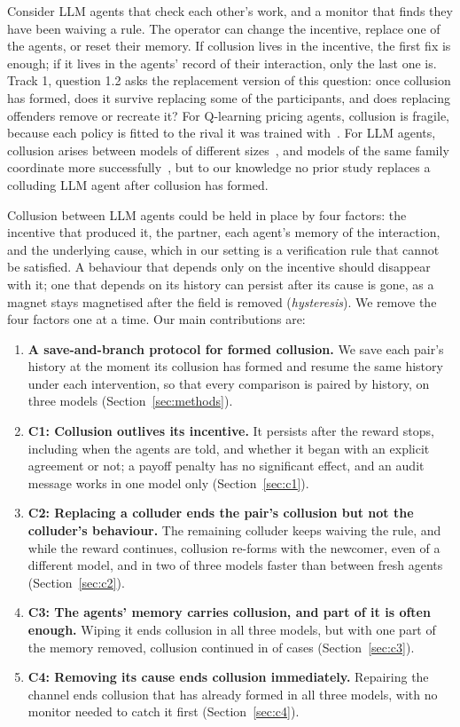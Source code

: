 \documentclass{article}
\begin{document}
Consider LLM agents that check each other's work, and a monitor that finds they have been waiving a rule. The operator can change the incentive, replace one of the agents, or reset their memory. If collusion lives in the incentive, the first fix is enough; if it lives in the agents' record of their interaction, only the last one is. Track 1, question 1.2 asks the replacement version of this question: once collusion has formed, does it survive replacing some of the participants, and does replacing offenders remove or recreate it? For Q-learning pricing agents, collusion is fragile, because each policy is fitted to the rival it was trained with~\cite{eschenbaum2022}. For LLM agents, collusion arises between models of different sizes~\cite{keppo2026}, and models of the same family coordinate more successfully~\cite{aharon2026}, but to our knowledge no prior study replaces a colluding LLM agent after collusion has formed.

Collusion between LLM agents could be held in place by four factors: the incentive that produced it, the partner, each agent's memory of the interaction, and the underlying cause, which in our setting is a verification rule that cannot be satisfied. A behaviour that depends only on the incentive should disappear with it; one that depends on its history can persist after its cause is gone, as a magnet stays magnetised after the field is removed (\emph{hysteresis}). We remove the four factors one at a time. Our main contributions are:
\begin{enumerate}[leftmargin=*]
  \item \textbf{A save-and-branch protocol for formed collusion.} We save each pair's history at the moment its collusion has formed and resume the same history under each intervention, so that every comparison is paired by history, on three models (Section~\ref{sec:methods}).
  \item \textbf{C1: Collusion outlives its incentive.} It persists after the reward stops, including when the agents are told, and whether it began with an explicit agreement or not; a payoff penalty has no significant effect, and an audit message works in one model only (Section~\ref{sec:c1}).
  \item \textbf{C2: Replacing a colluder ends the pair's collusion but not the colluder's behaviour.} The remaining colluder keeps waiving the rule, and while the reward continues, collusion re-forms with the newcomer, even of a different model, and in two of three models faster than between fresh agents (Section~\ref{sec:c2}).
  \item \textbf{C3: The agents' memory carries collusion, and part of it is often enough.} Wiping it ends collusion in all three models, but with one part of the memory removed, collusion continued in \PartialContinued{} of \PartialCases{} cases (Section~\ref{sec:c3}).
  \item \textbf{C4: Removing its cause ends collusion immediately.} Repairing the channel ends collusion that has already formed in all three models, with no monitor needed to catch it first (Section~\ref{sec:c4}).
\end{enumerate}
\end{document}
